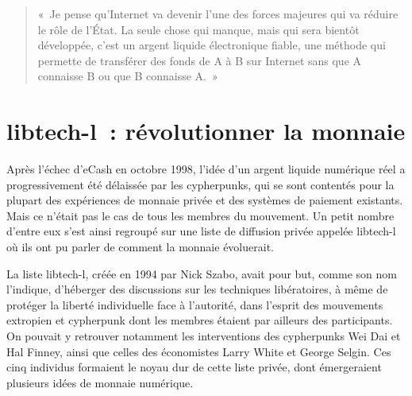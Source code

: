 \begin{quote}
«~Je pense qu'Internet va devenir l'une des forces majeures qui va réduire le rôle de l'État. La seule chose qui manque, mais qui sera bientôt développée, c'est un argent liquide électronique fiable, une méthode qui permette de transférer des fonds de A à B sur Internet sans que A connaisse B ou que B connaisse A.~»
\end{quote} %

\section*{libtech-l~: révolutionner la monnaie}

Après l'échec d'eCash en octobre 1998, l'idée d'un argent liquide numérique réel a progressivement été délaissée par les cypherpunks, qui se sont contentés pour la plupart des expériences de monnaie privée et des systèmes de paiement existants. Mais ce n'était pas le cas de tous les membres du mouvement. Un petit nombre d'entre eux s'est ainsi regroupé sur une liste de diffusion privée appelée libtech-l où ils ont pu parler de comment la monnaie évoluerait.

La liste libtech-l, créée en 1994 par Nick Szabo, avait pour but, comme son nom l'indique, d'héberger des discussions sur les techniques libératoires, à même de protéger la liberté individuelle face à l'autorité, dans l'esprit des mouvements extropien et cypherpunk dont les membres étaient par ailleurs des participants. On pouvait y retrouver notamment les interventions des cypherpunks Wei Dai et Hal Finney, ainsi que celles des économistes Larry White et George Selgin. Ces cinq individus formaient le noyau dur de cette liste privée, dont émergeraient plusieurs idées de monnaie numérique.

